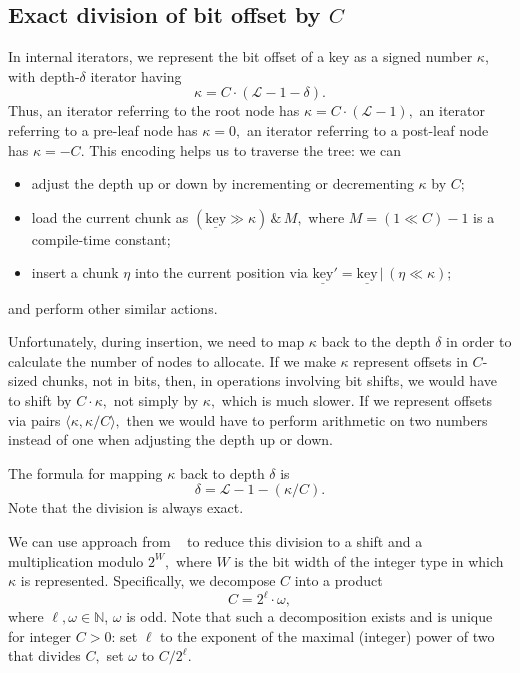 \documentclass[a4paper,12pt]{article}
\begin{document}
\subsection{Exact division of bit offset by $C$}

In internal iterators, we represent the bit offset of a key as a signed number $\kappa$, with depth-$\delta$ iterator having
$$\kappa = C \cdot (\mathcal{L} - 1 - \delta).$$
Thus, an iterator referring to the root node has $\kappa = C \cdot (\mathcal{L} - 1),$ an iterator referring to a pre-leaf node has $\kappa = 0,$
an iterator referring to a post-leaf node has $\kappa = -C.$
This encoding helps us to traverse the tree: we can
\begin{itemize}
    \item adjust the depth up or down by incrementing or decrementing $\kappa$ by $C;$
    \item load the current chunk as $(\underline{\mathrm{key}} \gg \kappa) \, \& \, M,$ where $M = (1 \ll C) - 1$ is a compile-time constant;
    \item insert a chunk $\eta$ into the current position via $\underline{\mathrm{key}}' = \underline{\mathrm{key}} \, | \, (\eta \ll \kappa);$
\end{itemize}
and perform other similar actions.

Unfortunately, during insertion, we need to map $\kappa$ back to the depth $\delta$ in order to calculate the number of nodes to allocate.
If we make $\kappa$ represent offsets in $C$-sized chunks, not in bits, then, in operations involving bit shifts, we would have to shift by $C \cdot \kappa,$ not simply by $\kappa,$
which is much slower.
If we represent offsets via pairs $\langle \kappa, \kappa / C \rangle,$ then we would have to perform arithmetic on two numbers
instead of one when adjusting the depth up or down.

The formula for mapping $\kappa$ back to depth $\delta$ is
$$
\delta = \mathcal{L} - 1 - (\kappa / C).
$$
Note that the division is always exact.

We can use approach from ~\cite{divcnst} to reduce this division to a shift and a multiplication modulo $2^W,$
where $W$ is the bit width of the integer type in which $\kappa$ is represented.
Specifically, we decompose $C$ into a product $$C = 2^\ell \cdot \omega,$$ where $\ell, \omega \in \mathbb{N}$, $\omega$ is odd.
Note that such a decomposition exists and is unique for integer $C > 0$:
set $\ell$ to the exponent of the maximal (integer) power of two that divides $C,$ set $\omega$ to $C / 2^\ell.$
\end{document}
